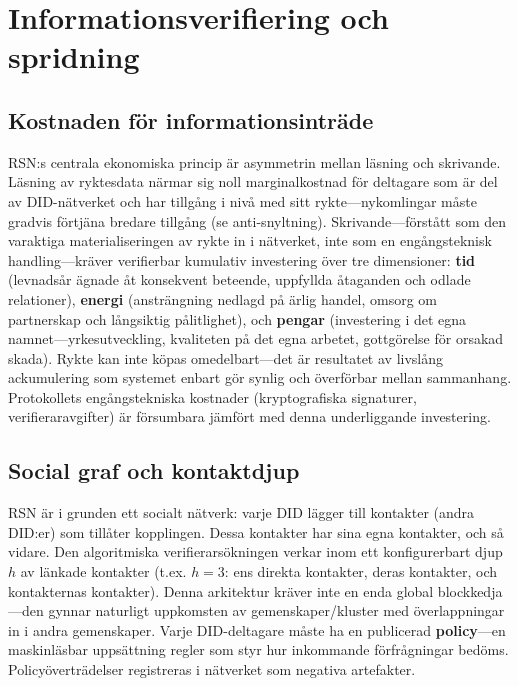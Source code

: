 \documentclass[11pt,a4paper,twocolumn]{article}
\begin{document}
\section{Informationsverifiering och spridning}

\subsection{Kostnaden för informationsinträde}

RSN:s centrala ekonomiska princip är asymmetrin mellan läsning och skrivande. Läsning av ryktesdata närmar sig noll marginalkostnad för deltagare som är del av DID-nätverket och har tillgång i nivå med sitt rykte---nykomlingar måste gradvis förtjäna bredare tillgång (se anti-snyltning). Skrivande---förstått som den varaktiga materialiseringen av rykte in i nätverket, inte som en engångsteknisk handling---kräver verifierbar kumulativ investering över tre dimensioner: \textbf{tid} (levnadsår ägnade åt konsekvent beteende, uppfyllda åtaganden och odlade relationer), \textbf{energi} (ansträngning nedlagd på ärlig handel, omsorg om partnerskap och långsiktig pålitlighet), och \textbf{pengar} (investering i det egna namnet---yrkesutveckling, kvaliteten på det egna arbetet, gottgörelse för orsakad skada). Rykte kan inte köpas omedelbart---det är resultatet av livslång ackumulering som systemet enbart gör synlig och överförbar mellan sammanhang. Protokollets engångstekniska kostnader (kryptografiska signaturer, verifieraravgifter) är försumbara jämfört med denna underliggande investering.

\subsection{Social graf och kontaktdjup}

RSN är i grunden ett socialt nätverk: varje DID lägger till kontakter (andra DID:er) som tillåter kopplingen. Dessa kontakter har sina egna kontakter, och så vidare. Den algoritmiska verifierarsökningen verkar inom ett konfigurerbart djup $h$ av länkade kontakter (t.ex. $h=3$: ens direkta kontakter, deras kontakter, och kontakternas kontakter). Denna arkitektur kräver inte en enda global blockkedja---den gynnar naturligt uppkomsten av gemenskaper/kluster med överlappningar in i andra gemenskaper. Varje DID-deltagare måste ha en publicerad \textbf{policy}---en maskinläsbar uppsättning regler som styr hur inkommande förfrågningar bedöms. Policyöverträdelser registreras i nätverket som negativa artefakter.
\end{document}

